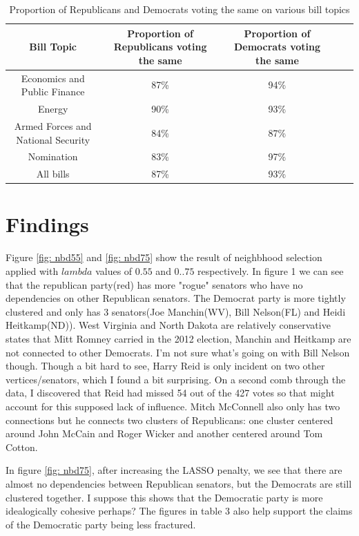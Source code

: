 \documentclass{article}
\begin{document}
\begin{table}
\centering
\vspace{-10pt}
\caption{\label{tbl: topics}Proportion of Republicans and Democrats voting the same on various bill topics}
\begin{adjustbox}{max width=\textwidth}
\begin{tabular}{c c c c c}
\hline
Bill Topic      & Proportion of Republicans voting the same & Proportion of Democrats voting the same    \\
\hline
Economics and Public Finance              & 87\% & 94\%\\ 
Energy                                    & 90\% & 93\%\\
Armed Forces and National Security        & 84\% & 87\%\\
Nomination                                & 83\% & 97\%\\
All bills                                 & 87\% & 93\%\\
\hline
\end{tabular}
\end{adjustbox}
\end{table}

\section{Findings}
Figure \ref{fig: nbd55} and \ref{fig: nbd75} show the result of neighbhood selection applied with $lambda$ values of $0.55$ and $0..75$ respectively. In figure 1 we can see that the republican party(red) has
more "rogue" senators who have no dependencies on other Republican senators. The Democrat party is more tightly clustered and only has 3 senators(Joe Manchin(WV), Bill Nelson(FL) and Heidi Heitkamp(ND)).  West Virginia and North Dakota are relatively conservative states that Mitt Romney carried in the 2012 election, Manchin and Heitkamp are not connected to other Democrats. I'm not sure what's going on with Bill Nelson though. Though a bit hard to see, Harry Reid is only incident on two other vertices/senators, which I found a bit surprising. On a second comb through the data, I discovered that Reid had missed 54 out of the 427 votes so that might account for this supposed lack of influence.
Mitch McConnell also only has two connections but he connects two clusters of Republicans: one cluster centered around John McCain and Roger Wicker and another centered around Tom Cotton.

In figure \ref{fig: nbd75}, after increasing the LASSO penalty, we see that there are almost no dependencies between Republican senators, but the Democrats are still clustered together. I suppose this shows that the Democratic party is more idealogically cohesive perhaps? The figures in table 3 also help support the claims of the Democratic party being less fractured.
\end{document}
